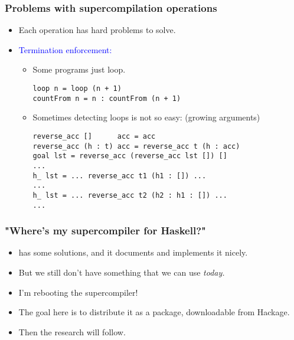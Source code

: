 \documentclass{beamer}
\begin{document}
\begin{frame}[fragile]
    \frametitle{Problems with supercompilation operations}

    \begin{itemize}

        \item[]
            Each operation has hard problems to solve.

        \item[]
            \textcolor{blue}{Termination enforcement:}

            \begin{itemize}[<+(1)->]

                \item[]
                    Some programs just loop.

                    \begin{verbatim}
loop n = loop (n + 1)
countFrom n = n : countFrom (n + 1)
                    \end{verbatim}

                \item[]
                    Sometimes detecting loops is not so easy: (growing
                    arguments)

                    \begin{verbatim}
reverse_acc []      acc = acc
reverse_acc (h : t) acc = reverse_acc t (h : acc)
goal lst = reverse_acc (reverse_acc lst []) []
...
h_ lst = ... reverse_acc t1 (h1 : []) ...
...
h_ lst = ... reverse_acc t2 (h2 : h1 : []) ...
...
                    \end{verbatim}

            \end{itemize}

    \end{itemize}
\end{frame}

\begin{frame}
    \frametitle{"Where's my supercompiler for Haskell?"}

    \begin{itemize}
        \item
            \citet{callbyneed-sc} has some solutions, and it documents and
            implements it nicely.

        \item
            But we still don't have something that we can use \textit{today.}

        \item
            I'm rebooting the supercompiler!

        \item
            The goal here is to distribute it as a package, downloadable from
            Hackage.

        \item
            Then the research will follow.
    \end{itemize}
\end{frame}
\end{document}
